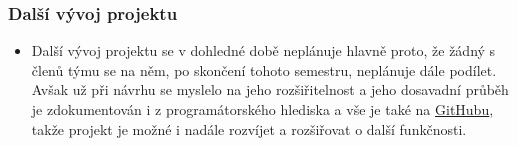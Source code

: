 \documentclass{beamer}
\begin{document}
\begin{frame}[allowframebreaks]\frametitle{Další vývoj projektu}
	
	\begin{itemize}	
		\item Další vývoj projektu se v dohledné době neplánuje hlavně proto, že žádný s členů týmu se na něm, po skončení tohoto semestru, neplánuje dále podílet. Avšak už při návrhu se myslelo na jeho rozšiřitelnost a jeho dosavadní průběh je zdokumentován i z programátorského hlediska a vše je také na \href{https://github.com/kozajaku/www-presentations-checker}{\underline{GitHubu}}, takže projekt je možné i nadále rozvíjet a rozšiřovat o další funkčnosti.
	\end{itemize}
		
\end{frame}
\end{document}
